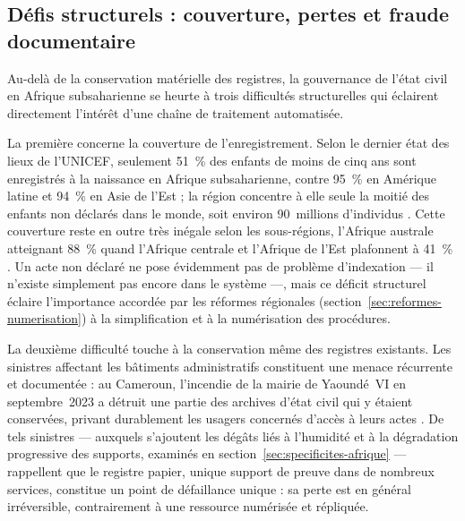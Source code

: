 \subsection{Défis structurels : couverture, pertes et fraude documentaire}
\label{sec:defis-structurels}

Au-delà de la conservation matérielle des registres, la gouvernance de l'état civil en Afrique subsaharienne se heurte à trois difficultés structurelles qui éclairent directement l'intérêt d'une chaîne de traitement automatisée.

La première concerne la couverture de l'enregistrement. Selon le dernier état des lieux de l'UNICEF, seulement 51~\% des enfants de moins de cinq ans sont enregistrés à la naissance en Afrique subsaharienne, contre 95~\% en Amérique latine et 94~\% en Asie de l'Est ; la région concentre à elle seule la moitié des enfants non déclarés dans le monde, soit environ 90~millions d'individus \cite{unicef2024birthregistration}.
Cette couverture reste en outre très inégale selon les sous-régions, l'Afrique australe atteignant 88~\% quand l'Afrique centrale et l'Afrique de l'Est plafonnent à 41~\% \cite{unicef2024birthregistration}.
Un acte non déclaré ne pose évidemment pas de problème d'indexation --- il n'existe simplement pas encore dans le système ---, mais ce déficit structurel éclaire l'importance accordée par les réformes régionales (section~\ref{sec:reformes-numerisation}) à la simplification et à la numérisation des procédures.

La deuxième difficulté touche à la conservation même des registres existants.
Les sinistres affectant les bâtiments administratifs constituent une menace récurrente et documentée : au Cameroun, l'incendie de la mairie de Yaoundé~VI en septembre~2023 a détruit une partie des archives d'état civil qui y étaient conservées, privant durablement les usagers concernés d'accès à leurs actes \cite{koaci2023yaounde}.
De tels sinistres --- auxquels s'ajoutent les dégâts liés à l'humidité et à la dégradation progressive des supports, examinés en section~\ref{sec:specificites-afrique} --- rappellent que le registre papier, unique support de preuve dans de nombreux services, constitue un point de défaillance unique : sa perte est en général irréversible, contrairement à une ressource numérisée et répliquée.

